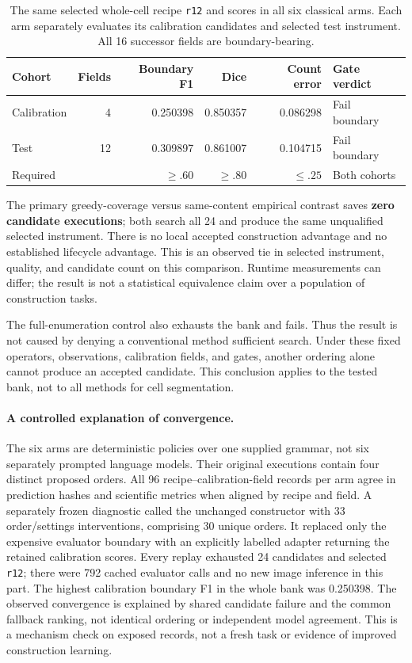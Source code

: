 \begin{table}[htbp]
\centering\small
\begin{tabularx}{\linewidth}{@{}P{1.12in}rrrrY@{}}
\toprule
\textbf{Cohort} & \textbf{Fields} & \textbf{Boundary F1} & \textbf{Dice} & \textbf{Count error} & \textbf{Gate verdict}\\
\midrule
Calibration & 4 & 0.250398 & 0.850357 & 0.086298 & Fail boundary\\
Test & 12 & 0.309897 & 0.861007 & 0.104715 & Fail boundary\\
\midrule
Required & & $\geq .60$ & $\geq .80$ & $\leq .25$ & Both cohorts\\
\bottomrule
\end{tabularx}
\caption{The same selected whole-cell recipe \texttt{r12} and scores in all six classical arms. Each arm separately evaluates its calibration candidates and selected test instrument. All 16 successor fields are boundary-bearing.}
\label{tab:classical-successor}
\end{table}

The primary greedy-coverage versus same-content empirical contrast saves \textbf{zero candidate executions}; both search all 24 and produce the same unqualified selected instrument. There is no local accepted construction advantage and no established lifecycle advantage. This is an observed tie in selected instrument, quality, and candidate count on this comparison. Runtime measurements can differ; the result is not a statistical equivalence claim over a population of construction tasks.

The full-enumeration control also exhausts the bank and fails. Thus the result is not caused by denying a conventional method sufficient search. Under these fixed operators, observations, calibration fields, and gates, another ordering alone cannot produce an accepted candidate. This conclusion applies to the tested bank, not to all methods for cell segmentation.

\paragraph{A controlled explanation of convergence.}
The six arms are deterministic policies over one supplied grammar, not six separately prompted language models. Their original executions contain four distinct proposed orders. All 96 recipe--calibration-field records per arm agree in prediction hashes and scientific metrics when aligned by recipe and field. A separately frozen diagnostic called the unchanged constructor with 33 order/settings interventions, comprising 30 unique orders. It replaced only the expensive evaluator boundary with an explicitly labelled adapter returning the retained calibration scores. Every replay exhausted 24 candidates and selected \texttt{r12}; there were 792 cached evaluator calls and no new image inference in this part. The highest calibration boundary F1 in the whole bank was 0.250398. The observed convergence is explained by shared candidate failure and the common fallback ranking, not identical ordering or independent model agreement. This is a mechanism check on exposed records, not a fresh task or evidence of improved construction learning.

